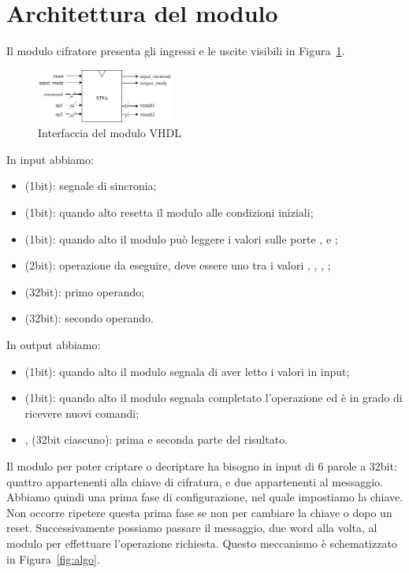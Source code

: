 \section{Architettura del modulo}

Il modulo cifratore presenta gli ingressi e le uscite visibili in Figura~\ref{fig:layout}.

\begin{figure}[h]
    \centering
    \includegraphics[width=0.4\textwidth]{vhdl_schemi/layout.png}
    \caption{Interfaccia del modulo VHDL}
    \label{fig:layout}
\end{figure}

In input abbiamo:
\begin{itemize}
    \item {} (1bit): segnale di sincronia;
    \item {} (1bit): quando alto resetta il modulo alle condizioni iniziali;
    \item {} (1bit): quando alto il modulo può leggere i valori sulle porte ,  e ;
    \item {} (2bit): operazione da eseguire, deve essere uno tra i valori , , , ;
    \item {} (32bit): primo operando;
    \item {} (32bit): secondo operando.
\end{itemize}
In output abbiamo:
\begin{itemize}
    \item {} (1bit): quando alto il modulo segnala di aver letto i valori in input;
    \item {} (1bit): quando alto il modulo segnala completato l'operazione ed è in grado di ricevere nuovi comandi;
    \item {},  (32bit ciascuno): prima e seconda parte del risultato.
\end{itemize}

Il modulo per poter criptare o decriptare ha bisogno in input di 6 parole a 32bit: quattro appartenenti alla chiave di cifratura, e due appartenenti al messaggio. Abbiamo quindi una prima fase di configurazione, nel quale impostiamo la chiave. Non occorre ripetere questa prima fase se non per cambiare la chiave o dopo un reset. Successivamente possiamo passare il messaggio, due word alla volta, al modulo per effettuare l'operazione richiesta. Questo meccanismo è schematizzato in Figura~\ref{fig:algo}.

